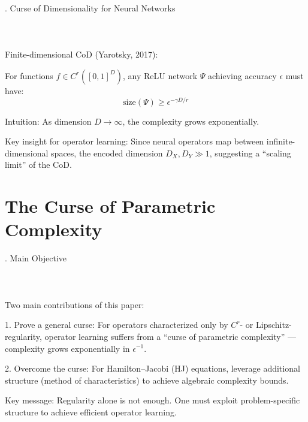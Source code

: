 \documentclass{beamer}
\def\b{\color{blue}}
\def\r{\color{red}}
\begin{document}
\begin{frame}{\thesection. Curse of Dimensionality for Neural Networks}
\framesubtitle{$\quad$}
{\Large {\b Finite-dimensional CoD} (Yarotsky, 2017):}
\medskip

{\Large For functions $ f \in C^r([0,1]^D) $, any ReLU network $ \Psi $ achieving accuracy $ \epsilon $ must have:
$$
\text{size}(\Psi) \ge \epsilon^{-\gamma D / r}
$$
}
\medskip

{\Large {\b Intuition}: As dimension $ D \to \infty $, the complexity grows exponentially.}
\medskip

{\Large {\b Key insight for operator learning}: Since neural operators map between {\r infinite-dimensional} spaces, the encoded dimension $ D_X, D_Y \gg 1 $, suggesting a ``scaling limit'' of the CoD.}

\end{frame}

\section{{\Large The Curse of Parametric Complexity}}

\begin{frame}{\thesection. Main Objective}
\framesubtitle{$\quad$}
{\Large {\b Two main contributions of this paper:}}
\medskip

{\Large {\b 1.} {\r Prove a general curse}: For operators characterized only by $ C^r $- or Lipschitz-regularity, operator learning suffers from a ``curse of parametric complexity'' --- complexity grows {\r exponentially} in $ \epsilon^{-1} $.}
\medskip

{\Large {\b 2.} {\b Overcome the curse}: For Hamilton--Jacobi (HJ) equations, leverage additional structure (method of characteristics) to achieve {\b algebraic} complexity bounds.}
\medskip

{\Large {\b Key message}: Regularity alone is not enough. One must exploit {\r problem-specific structure} to achieve efficient operator learning.}

\end{frame}
\end{document}
